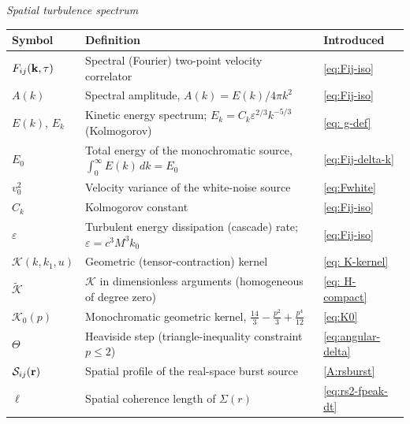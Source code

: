 \documentclass[10pt,prd,aps,nobibnotes,superscriptaddress,preprintnumbers,notitlepage]{revtex4-1}
\newcommand{\br}{{\bf r}}
\newcommand{\kb}{{\bf k}}
\begin{document}
\medskip\noindent \emph{Spatial turbulence spectrum}\par\nobreak\smallskip
\noindent\begin{tabular}{@{}p{} p{} p{}@{}}
\hline\hline
Symbol & Definition & Introduced \\
\hline
$F_{ij}(\kb,\tau)$    & Spectral (Fourier) two-point velocity correlator & \eqref{eq:Fij-iso}\\
$A(k)$                & Spectral amplitude, $A(k)=E(k)/4\pi k^2$ & \eqref{eq:Fij-iso}\\
$E(k)$, $E_k$         & Kinetic energy spectrum; $E_k=C_k\varepsilon^{2/3}k^{-5/3}$ (Kolmogorov) & \eqref{eq: g-def}\\
$E_0$                 & Total energy of the monochromatic source, $\int_0^\infty\!E(k)\,dk=E_0$ & \eqref{eq:Fij-delta-k}\\
$v_0^2$               & Velocity variance of the white-noise source & \eqref{eq:Fwhite}\\
$C_k$                 & Kolmogorov constant & \eqref{eq:Fij-iso}\\
$\varepsilon$         & Turbulent energy dissipation (cascade) rate; $\varepsilon=c^3M^3k_0$ & \eqref{eq:Fij-iso}\\
$\mathcal{K}(k,k_1,u)$ & Geometric (tensor-contraction) kernel & \eqref{eq: K-kernel}\\
$\widetilde{\mathcal{K}}$ & $\mathcal{K}$ in dimensionless arguments (homogeneous of degree zero) & \eqref{eq: H-compact}\\
$\mathcal{K}_0(p)$    & Monochromatic geometric kernel, $\tfrac{14}{3}-\tfrac{p^2}{3}+\tfrac{p^4}{12}$ & \eqref{eq:K0}\\
$\Theta$              & Heaviside step (triangle-inequality constraint $p\le2$) & \eqref{eq:angular-delta}\\
$\mathcal{S}_{ij}(\br)$ & Spatial profile of the real-space burst source & \eqref{A:rsburst}\\
$\ell$                & Spatial coherence length of $\Sigma(r)$ & \eqref{eq:rs2-fpeak-dt}\\
\hline\hline
\end{tabular}\par
\end{document}
